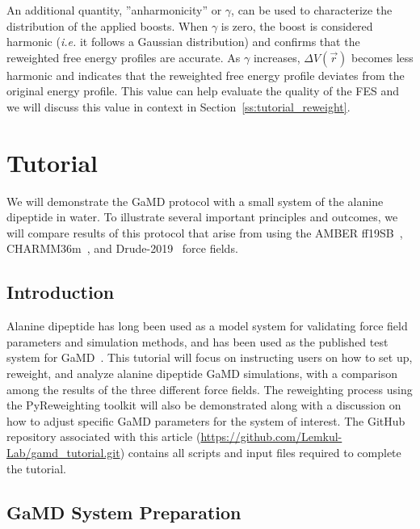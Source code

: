 \documentclass[9pt,tutorial]{livecoms}
\newcommand{\githubrepository}{\url{https://github.com/Lemkul-Lab/gamd_tutorial.git}}  %
\begin{document}
An additional quantity, ''anharmonicity'' or $\gamma$, can be used to characterize the distribution of the applied boosts. When $\gamma$ is zero, the boost is considered harmonic (\textit{i.e.} it follows a Gaussian distribution) and confirms that the reweighted free energy profiles are accurate. As $\gamma$ increases, $\Delta{V(\vec{r})}$ becomes less harmonic and indicates that the reweighted free energy profile deviates from the original energy profile. This value can help evaluate the quality of the FES and we will discuss this value in context in Section~\ref{ss:tutorial_reweight}.

\section{Tutorial} 
\label{sec:tutorial}
We will demonstrate the GaMD protocol with a small system of the alanine dipeptide in water. To illustrate several important principles and outcomes, we will compare results of this protocol that arise from using the AMBER ff19SB~\cite{tian_ff19sb_2020}, CHARMM36m~\cite{huang_charmm36m_2017}, and Drude-2019~\cite{lin_further_2020} force fields. 

\subsection{Introduction}
Alanine dipeptide has long been used as a model system for validating force field parameters and simulation methods, and has been used as the published test system for GaMD~\cite{miao_gaussian_2015, pang_gaussian_2017, copeland_gaussian_2022}. This tutorial will focus on instructing users on how to set up, reweight, and analyze alanine dipeptide GaMD simulations, with a comparison among the results of the three different force fields. The reweighting process using the PyReweighting toolkit will also be demonstrated along with a discussion on how to adjust specific GaMD parameters for the system of interest. The GitHub repository associated with this article (\githubrepository) contains all scripts and input files required to complete the tutorial.

\subsection{GaMD System Preparation} 
\end{document}
